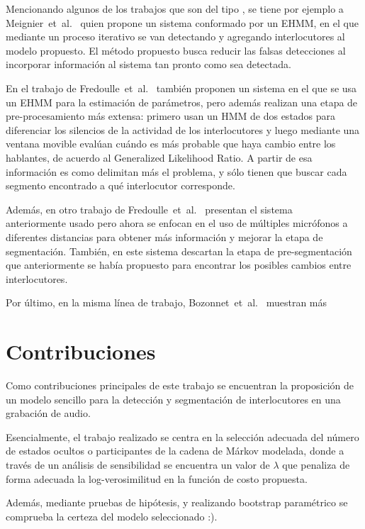 Mencionando algunos de los trabajos que son del tipo \td, se tiene por ejemplo a Meignier~et~al.~\cite{Meignier2001} quien propone un sistema conformado por un \ac{EHMM}, en el que mediante un proceso iterativo se van detectando y agregando interlocutores al modelo propuesto. El método propuesto busca reducir las falsas detecciones al incorporar información al sistema tan pronto 
como sea detectada. 

En el trabajo de Fredoulle~et~al.~\cite{Fredouille2007} también proponen un sistema en el que se usa un \ac{EHMM} para la estimación de parámetros, pero además realizan una etapa de pre-procesamiento más extensa: primero usan un \ac{HMM} de dos estados para diferenciar los silencios de la actividad de los interlocutores y luego mediante una ventana movible evalúan cuándo es más probable que haya cambio entre los hablantes, de acuerdo al Generalized Likelihood Ratio. A partir de esa información es como delimitan más el problema, y sólo tienen que buscar cada segmento encontrado a qué interlocutor corresponde.

Además, en otro trabajo de Fredoulle~et~al.~\cite{Fredouille2009} presentan el sistema \td~ anteriormente usado pero ahora se enfocan en el uso de múltiples micrófonos a diferentes distancias para obtener más información y mejorar la etapa de segmentación. También, en este sistema descartan la etapa de pre-segmentación que anteriormente se había propuesto para encontrar los posibles cambios entre interlocutores. 

Por último, en la misma línea de trabajo, Bozonnet~et~al.~\cite{Bozonnet2010} muestran más 

\section{Contribuciones}

Como contribuciones principales de este trabajo se encuentran la proposición de un modelo sencillo para la detección y segmentación de interlocutores en una grabación de audio.

Esencialmente, el trabajo realizado se centra en la selección adecuada del número de estados ocultos o participantes de la cadena de Márkov modelada, donde a través de un análisis de sensibilidad se encuentra un valor de $\lambda$ que penaliza de forma adecuada la log-verosimilitud en la función de costo propuesta. 

Además, mediante pruebas de hipótesis, y realizando bootstrap paramétrico se comprueba la certeza del modelo seleccionado :).